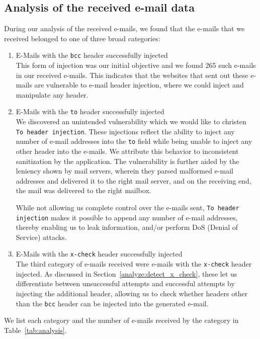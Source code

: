 \subsection{Analysis of the received e-mail data}
During our analysis of the received e-mails, we found that the e-mails that we received belonged to one of three broad categories:
\begin{enumerate}
	\item E-Mails with the \texttt{bcc} header successfully injected\\
	This form of injection was our initial objective and we found 265 such e-mails in our received e-mails. This indicates that the websites that sent out these e-mails are vulnerable to e-mail header injection, where we could inject and manipulate any header.
	
	\item E-Mails with the \texttt{to} header successfully injected\\
	We discovered an unintended vulnerability which we would like to christen \texttt{To~header injection}. These injections reflect the ability to inject any number of e-mail addresses into the \texttt{to} field while being unable to inject any other header into the e-mails. We attribute this behavior to inconsistent sanitization by the application. 
	The vulnerability is further aided by the leniency shown by mail servers, wherein they parsed malformed e-mail addresses and delivered it to the right mail server, and on the receiving end, the mail was delivered to the right mailbox. 
	
	While not allowing us complete control over the e-mails sent, \texttt{To header injection} makes it possible to append any number of e-mail addresses, thereby enabling us to leak information, and/or perform DoS (Denial of Service) attacks.
	
	\item E-Mails with the \texttt{x-check} header successfully injected\\
    The third category of e-mails received were e-mails with the \texttt{x-check} header injected. As discussed in Section~\ref{analyze:detect_x_check}, 
    these let us differentiate between unsuccessful attempts and successful attempts by injecting the additional header, allowing us to check whether headers other than the \texttt{bcc} header can be injected into the generated e-mail. 
\end{enumerate}
We list each category and the number of e-mails received by the category in Table~\ref{tab:analysis}. 

